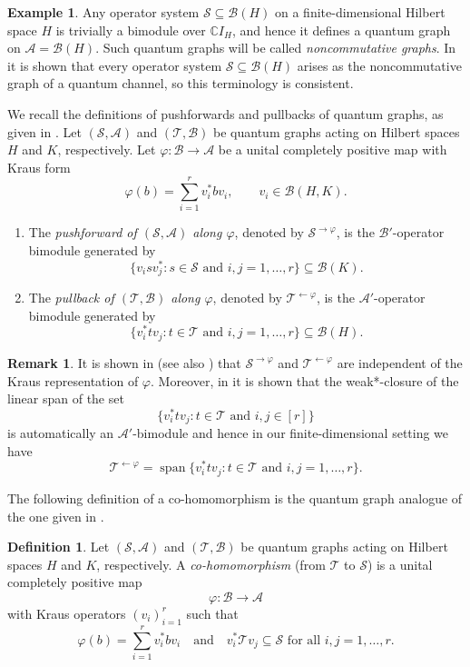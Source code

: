 \documentclass[11pt]{amsart}
\numberwithin{equation}{section}
\theoremstyle{plain}
\theoremstyle{definition}
\newtheorem{definition}[theorem]{Definition}
\newtheorem{example}[theorem]{Example}
\newtheorem{remark}[theorem]{Remark}
\theoremstyle{remark}
\newcommand{\A}{{\mathcal{A}}}
\newcommand{\B}{{\mathcal{B}}}
\renewcommand{\S}{{\mathcal{S}}}
\newcommand{\T}{{\mathcal{T}}}
\newcommand\vphi{\varphi}
\newcommand{\bC}{\mathbb{C}}
\newcommand{\foral}{\text{ for all }}
\newcommand{\qand}{\quad\text{and}\quad}
\newcommand{\spn}{\operatorname{span}}
\begin{document}
\begin{example}
Any operator system $\S \subseteq \B(H)$ on a finite-dimensional Hilbert space $H$ is trivially a bimodule over $\bC I_H$, and hence it defines a quantum graph on $\A = \B(H)$. Such quantum graphs will be called \emph{noncommutative graphs}. In \cite[Lemma~2]{DUAN09} it is shown that every operator system $\S \subseteq \B(H)$ arises as the noncommutative graph of a quantum channel, so this terminology is consistent.
\end{example}

We recall the definitions of pushforwards and pullbacks of quantum graphs, as given in \cite{Wea21}. Let $(\S,\A)$ and $(\T, \B)$ be quantum graphs acting on Hilbert spaces $H$ and $K$, respectively.
Let $\vphi\colon \B\to \A$ be a unital completely positive map with Kraus form
\[
\vphi(b)=\sum_{i=1}^r v_i^* b v_i,
\qquad v_i\in \B(H,K).
\]
\begin{enumerate}
\item
The \emph{pushforward of $(\S, \A)$ along $\vphi$}, denoted by
$\S^{\rightarrow\vphi}$, is the $\B'$-operator bimodule generated by
\[
\{v_i s v_j^* : s\in\S \text{ and } i,j=1,\dots,r\}
\subseteq \B(K).
\]
\item
The \emph{pullback of $(\T, \B)$ along $\vphi$}, denoted by
$\T^{\leftarrow\vphi}$, is the $\A'$-operator bimodule generated by
\[
\{v_i^*t v_j : t\in\T \text{ and } i,j=1,\dots,r \}
\subseteq \B(H).
\]
\end{enumerate}


\begin{remark}
It is shown in \cite{Wea21} (see also \cite{Daws24}) that $\S^{\rightarrow\vphi}$ and $\T^{\leftarrow\vphi}$ are independent of the Kraus representation of $\vphi$. Moreover, in \cite[Theorem 7.5]{Daws24} it is shown that the weak*-closure of the linear span of the set 
\[
\{v_i^*t v_j : t\in\T \text{ and } i,j \in [r] \}
\]
is automatically an $\A'$-bimodule and hence in our finite-dimensional setting we have 
\[
\T^{\leftarrow\vphi}=\spn\{v_i^*t v_j : t\in\T \text{ and } i,j=1,\dots,r \}.
\]
\end{remark}

The following definition of a co-homomorphism is the quantum graph analogue of the one given in \cite[Section 7]{EKT21}.
\begin{definition}
Let $(\S,\A)$ and $(\T, \B)$ be quantum graphs acting on  Hilbert spaces $H$ and $K$, respectively.
A \emph{co-homomorphism} (from $\T$ to $\S$) is a unital completely positive map
\[
\vphi \colon \B \longrightarrow \A
\]
with Kraus operators $(v_i)_{i=1}^r$ such that
\[
\vphi(b)=\sum_{i=1}^r v_i^*b v_i
\qand
v_i^*\T v_j \subseteq \S
\foral i,j=1,\dots,r.
\]
\end{definition}
\end{document}
